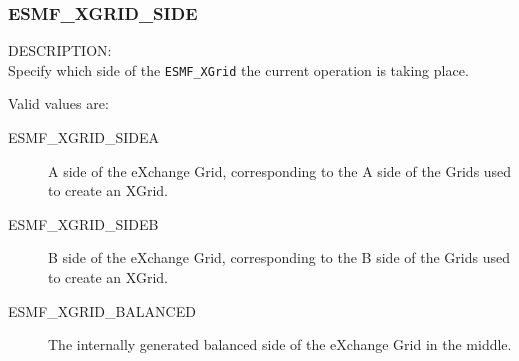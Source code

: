 


\subsubsection{ESMF\_XGRID\_SIDE}
\label{opt:xgridoptions}
{\sf DESCRIPTION:\\}  
Specify which side of the {\tt ESMF\_XGrid} the current operation is taking place.

Valid values are:
\begin{description}
\item [ESMF\_XGRID\_SIDEA]
  A side of the eXchange Grid, corresponding to the A side of the Grids used to create an XGrid.
\item [ESMF\_XGRID\_SIDEB]
  B side of the eXchange Grid, corresponding to the B side of the Grids used to create an XGrid.
\item [ESMF\_XGRID\_BALANCED]
  The internally generated balanced side of the eXchange Grid in the middle.

\end{description}


